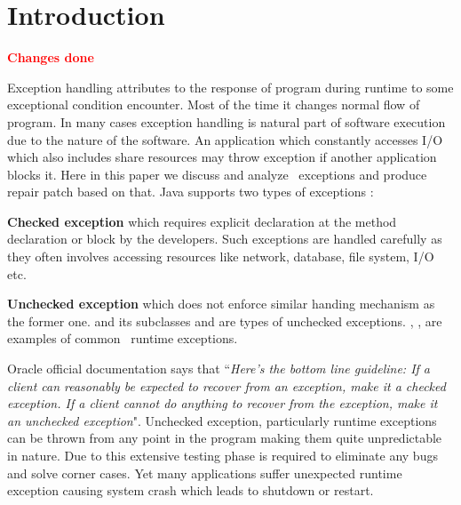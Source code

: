 \section{Introduction}
\label{sec:intro}

\textcolor{red}{\textbf{Changes done}}\newline

Exception handling attributes to the response of program during runtime to some
exceptional condition encounter.
Most of the time it changes normal flow of program. In many cases exception
handling is natural part of software execution due to the nature of the
software.
An application which constantly accesses I/O which also includes share resources
may throw exception if another application blocks it.
Here in this paper we discuss and analyze \java\ exceptions and produce repair
patch based on that. Java supports two types of exceptions :
\begin{mylist}
	
\item \textbf{Checked exception} which requires explicit 
declaration at the method declaration or  block by the
developers. Such exceptions are handled carefully as they often involves
accessing resources like network, database, file system, I/O etc.
	
\item \textbf{Unchecked exception} which does not enforce similar handing
mechanism as the former one.  and its
subclasses and  are types of unchecked exceptions.
, ,
 are examples of common \java\ runtime exceptions.

\end{mylist}

Oracle official documentation says that ``\emph{Here's the bottom line
guideline: If a client can reasonably be expected to recover from an exception,
 make it a checked exception. If a client cannot do anything to recover from the
 exception, make it an unchecked exception}".
 Unchecked exception, particularly runtime exceptions can be thrown from any
 point in the program making them quite unpredictable in nature.
 Due to this extensive testing phase is required to eliminate any bugs and solve
 corner cases.
 Yet many applications suffer unexpected runtime exception causing system crash
 which leads to shutdown or restart.

